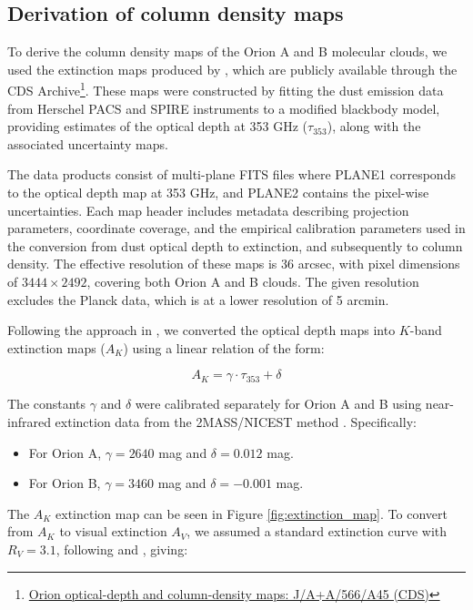 \subsection{Derivation of column density maps}

To derive the column density maps of the Orion A and B molecular clouds, we used the extinction maps produced by \cite{lombardi2014herschel}, which are publicly available through the CDS Archive\footnote{\href{https://cdsarc.cds.unistra.fr/viz-bin/cat/J/A+A/566/A45\#/browse}{Orion optical-depth and column-density maps: J/A+A/566/A45 (CDS)}}. 
These maps were constructed by fitting the dust emission data from Herschel PACS and SPIRE instruments to a modified blackbody model, providing estimates of the optical depth at 353 GHz ($\tau_{353}$), along with the associated uncertainty maps.

The data products consist of multi-plane FITS files where PLANE1 corresponds to the optical depth map at 353 GHz, and PLANE2 contains the pixel-wise uncertainties. Each map header includes metadata describing projection parameters, coordinate coverage, and the empirical calibration parameters used in the conversion from dust optical depth to extinction, and subsequently to column density. The effective resolution of these maps is 36 arcsec, with pixel dimensions of $3444 \times 2492$, covering both Orion A and B clouds. The given resolution excludes the Planck data, which is at a lower resolution of 5 arcmin.

Following the approach in \cite{lombardi2014herschel}, we converted the optical depth maps into $K$-band extinction maps ($A_K$) using a linear relation of the form:

\begin{equation}
    A_K = \gamma \cdot \tau_{353} + \delta
    \label{eq:ak_tau_relation}
\end{equation}

The constants $\gamma$ and $\delta$ were calibrated separately for Orion A and B using near-infrared extinction data from the 2MASS/NICEST method \cite{lombardi2009nicest}. Specifically:
\begin{itemize}
    \item For Orion A, $\gamma = 2640$ mag and $\delta = 0.012$ mag.
    \item For Orion B, $\gamma = 3460$ mag and $\delta = -0.001$ mag.
\end{itemize}

The $A_K$ extinction map can be seen in Figure \ref{fig:extinction_map}. 
To convert from $A_K$ to visual extinction $A_V$, we assumed a standard extinction curve with $R_V = 3.1$, following \cite{bohlin1978survey} and \cite{rieke1985interstellar}, giving:

